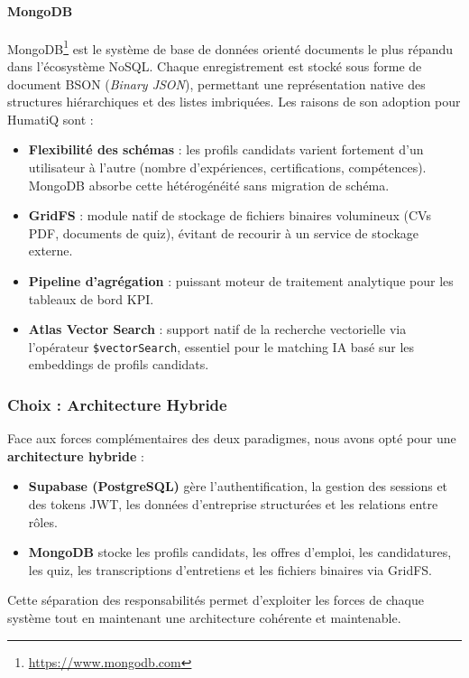 \paragraph{MongoDB}
MongoDB\footnote{\url{https://www.mongodb.com}} est le système de base de données orienté documents le plus répandu dans l'écosystème NoSQL. Chaque enregistrement est stocké sous forme de document BSON (\textit{Binary JSON}), permettant une représentation native des structures hiérarchiques et des listes imbriquées.
\noindent Les raisons de son adoption pour HumatiQ sont :
\begin{itemize}
    \item \textbf{Flexibilité des schémas} : les profils candidats varient fortement d'un utilisateur à l'autre (nombre d'expériences, certifications, compétences). MongoDB absorbe cette hétérogénéité sans migration de schéma.
    \item \textbf{GridFS} : module natif de stockage de fichiers binaires volumineux (CVs PDF, documents de quiz), évitant de recourir à un service de stockage externe.
    \item \textbf{Pipeline d'agrégation} : puissant moteur de traitement analytique pour les tableaux de bord KPI.
    \item \textbf{Atlas Vector Search} : support natif de la recherche vectorielle via l'opérateur \texttt{\$vectorSearch}, essentiel pour le matching IA basé sur les embeddings de profils candidats.
\end{itemize}
\subsubsection{Choix : Architecture Hybride}
Face aux forces complémentaires des deux paradigmes, nous avons opté pour une \textbf{architecture hybride} :
\begin{itemize}
    \item \textbf{Supabase (PostgreSQL)} gère l'authentification, la gestion des sessions et des tokens JWT, les données d'entreprise structurées et les relations entre rôles.
    \item \textbf{MongoDB} stocke les profils candidats, les offres d'emploi, les candidatures, les quiz, les transcriptions d'entretiens et les fichiers binaires via GridFS.
\end{itemize}
Cette séparation des responsabilités permet d'exploiter les forces de chaque système tout en maintenant une architecture cohérente et maintenable.
